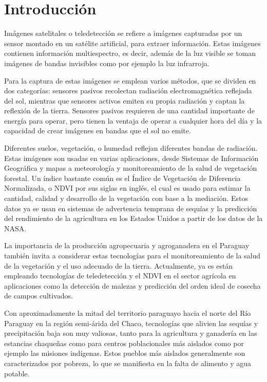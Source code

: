 \section{Introducción}

Imágenes satelitales o teledetección se refiere a imágenes capturadas por un sensor montado en un satélite artificial,
para extraer información. Estas imágenes contienen información multiespectro, es decir, además de la luz visible se
toman imágenes de bandas invisibles como por ejemplo la luz infrarroja. \autocite{globalforestlink-how-sat-imaging-work}

Para la captura de estas imágenes se emplean varios métodos, que se dividen en dos categorías: sensores pasivos
recolectan radiación electromagnética reflejada del sol, mientras que sensores activos emiten su propia radiación y
captan la reflexión de la tierra. Sensores pasivos requieren de una cantidad importante de energía para operar, pero
tienen la ventaja de operar a cualquier hora del día y la capacidad de crear imágenes en bandas que el sol no emite.
\autocite{globalforestlink-how-sat-imaging-work}

Diferentes suelos, vegetación, o humedad reflejan diferentes bandas de radiación. Estas imágenes son usadas en varias
aplicaciones, desde Sistemas de Información Geográfica y mapas a meteorología y monitoreamiento de la salud de
vegetación forestal. Un índice bastante común es el Índice de Vegetación de Diferencia Normalizada, o NDVI por sus
siglas en inglés, el cual es usado para estimar la cantidad, calidad y desarrollo de la vegetación con base a la
mediación. Estos datos ya se usan en sistemas de advertencia temprana de sequías y la predicción del rendimiento de la
agricultura en los Estados Unidos a partir de los datos de la NASA. \autocite{earthdata-vegetation}

La importancia de la producción agropecuaria y agroganadera en el Paraguay también invita a considerar estas
tecnologías para el monitoreamiento de la salud de la vegetación y el uso adecuado de la tierra. Actualmente, ya es
están empleando tecnologías de teledetección y el NDVI en el sector agrícola en aplicaciones como la detección de
malezas y predicción del orden ideal de cosecha de campos cultivados. \autocite{onesoil-agricultura-paraguay}

Con aproximadamente la mitad del territorio paraguayo hacia el norte del Río Paraguay en la región semi-árida del
Chaco, tecnologías que alivien las sequías y precipitación baja son muy valiosas, tanto para la agricultura y ganadería
en las estancias chaqueñas como para centros poblacionales más aislados como por ejemplo las misiones indígenas. Estos
pueblos más aislados generalmente son caracterizados por pobreza, lo que se manifiesta en la falta de alimento y agua
potable.

